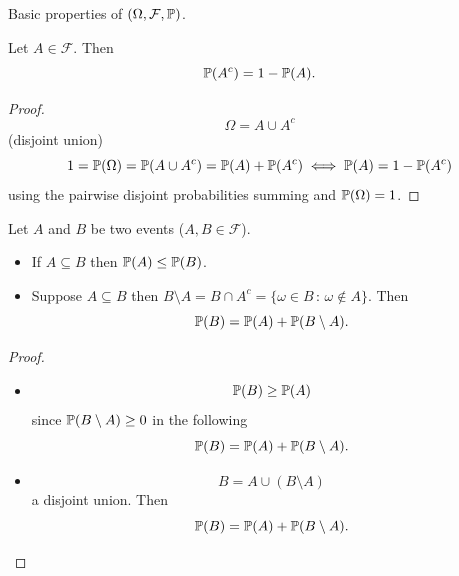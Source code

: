 \documentclass[10pt, a4paper]{article}
\begin{document}
Basic properties of $(\Omega, \mathcal{F}, \P)$.

\begin{proposition}
    Let $A \in \mathcal{F}$.
    Then
    \[
    \P(A ^ c) = 1 - \P(A).
    \]

    \begin{proof}
        \[
        \Omega = A \cup A ^ c
        \]
        (disjoint union)
        \[
        1 = \P(\Omega) = \P(A \cup A ^ c) = \P(A) + \P(A ^ c) \iff \P(A) = 1 - \P(A ^ c)
        \]
        using the pairwise disjoint probabilities summing and $\P(\Omega) = 1$.
    \end{proof}
\end{proposition}

\begin{proposition}
    Let $A$ and $B$ be two events
    ($A, B \in \mathcal{F}$).
    \begin{itemize}
        \item If $A \subseteq B$ then $\P(A) \leq \P(B)$.

        \item Suppose $A \subseteq B$ then $B \setminus A = B \cap A ^ c = \{\omega \in B\,:\, \omega \notin A\}$.
        Then
        \[
        \P(B) = \P(A) + \P(B \setminus A).
        \]
    \end{itemize}
    
    \begin{proof}
        \begin{itemize}
            \item
            \[
            \P(B) \geq \P(A)
            \]
            since $\P(B \setminus A) \geq 0$ in the following
            \[
            \P(B) = \P(A) + \P(B \setminus A).
            \]
            
            \item
            \[
            B = A \cup (B \setminus A)
            \]
            a disjoint union.
            Then
            \[
            \P(B) = \P(A) + \P(B \setminus A).
            \]
        \end{itemize}
    \end{proof}
\end{proposition}
\end{document}
